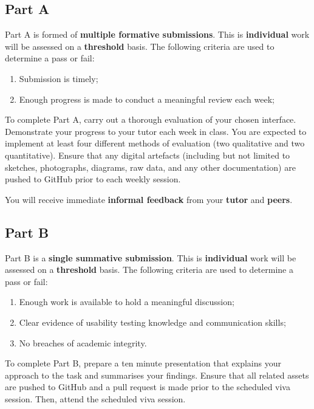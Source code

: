 \documentclass{../fal_assignment}
\begin{document}
\subsection*{Part A}

Part A is formed of \textbf{multiple formative submissions}. This is \textbf{individual} work will be assessed on a \textbf{threshold} basis. The following criteria are used to determine a pass or fail:

\begin{enumerate}[label=(\alph*)]
	\item Submission is timely;
	\item Enough progress is made to conduct a meaningful review each week;
\end{enumerate}

To complete Part A, carry out a thorough evaluation of your chosen interface. Demonstrate your progress to your tutor each week in class. You are expected to implement at least four different methods of evaluation (two qualitative and two quantitative). Ensure that any digital artefacts (including but not limited to sketches, photographs, diagrams, raw data, and any other documentation) are pushed to GitHub prior to each weekly session. 

You will receive immediate \textbf{informal feedback} from your \textbf{tutor} and \textbf{peers}.

\subsection*{Part B}

Part B is a \textbf{single summative submission}. This is \textbf{individual} work will be assessed on a \textbf{threshold} basis. The following criteria are used to determine a pass or fail: 

\begin{enumerate}[label=(\alph*)]
	\item Enough work is available to hold a meaningful discussion; 
	\item Clear evidence of usability testing knowledge and communication skills; 
	\item No breaches of academic integrity. 
\end{enumerate}

To complete Part B, prepare a ten minute presentation that explains your approach to the task and summarises your findings. Ensure that all related assets are pushed to GitHub and a pull request is made prior to the scheduled viva session. Then, attend the scheduled viva session. 
\end{document}
